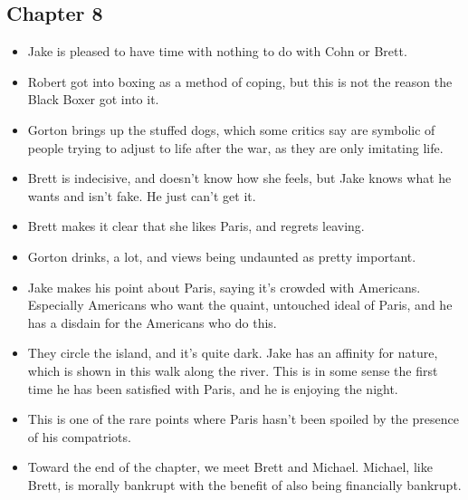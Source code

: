 \documentclass[11pt]{article}
\begin{document}
\subsection{Chapter 8}
\begin{itemize}
	\item Jake is pleased to have time with nothing to do with Cohn or Brett.
	\item Robert got into boxing as a method of coping, but this is not the 
		reason the Black Boxer got into it.
	\item Gorton brings up the stuffed dogs, which some critics say are 
		symbolic of people trying to adjust to life after the war, as they are 
		only imitating life.
	\item Brett is indecisive, and doesn't know how she feels, but Jake knows 
		what he wants and isn't fake.  He just can't get it.
	\item Brett makes it clear that she likes Paris, and regrets leaving.
	\item Gorton drinks, a lot, and views being undaunted as pretty important.
	\item Jake makes his point about Paris, saying it's crowded with Americans.
		Especially Americans who want the quaint, untouched ideal of Paris, and
		he has a disdain for the Americans who do this.
	\item They circle the island, and it's quite dark.  Jake has an affinity
		for nature, which is shown in this walk along the river.  This is in
		some sense the first time he has been satisfied with Paris, and he 
		is enjoying the night.
	\item This is one of the rare points where Paris hasn't been spoiled by the
		presence of his compatriots.
	\item Toward the end of the chapter, we meet Brett and Michael.  Michael,
		like Brett, is morally bankrupt with the benefit of also being
		financially bankrupt.
	\end{itemize}
\end{document}
